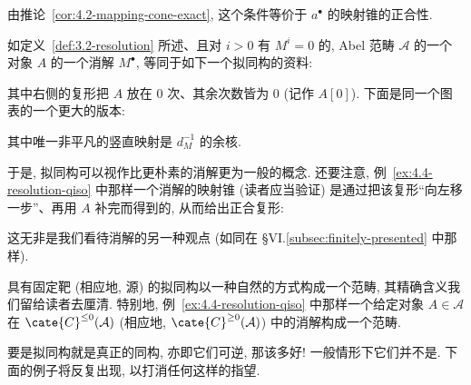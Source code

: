 \indent 由推论~\ref{cor:4.2-mapping-cone-exact}, 这个条件等价于 $a^\bullet$ 的映射锥的正合性.

\begin{example}\label{ex:4.4-resolution-qiso}
如定义~\ref{def:3.2-resolution} 所述、且对 $i>0$ 有 $M^i=0$ 的, Abel 范畴 $\mathcal A$ 的一个对象 $A$ 的一个消解 $M^\bullet$, 等同于如下一个拟同构的资料:
\begin{center}
\end{center}
其中右侧的复形把 $A$ 放在 0 次、其余次数皆为 $0$ (记作 $A[0]$). 下面是同一个图表的一个更大的版本:
\begin{center}
\end{center}
其中唯一非平凡的竖直映射是 $d_M^{-1}$ 的余核.
\end{example}

\indent 于是, 拟同构可以视作比更朴素的消解更为一般的概念. 还要注意, 例~\ref{ex:4.4-resolution-qiso} 中那样一个消解的映射锥 (读者应当验证) 是通过把该复形``向左移一步''、再用 $A$ 补完而得到的, 从而给出正合复形:
\begin{center}
\end{center}
这无非是我们看待消解的另一种观点 (如同在 §VI.\ref{subsec:finitely-presented} 中那样).

\begin{remark}\label{rmk:4.5-qiso-category}
具有固定靶 (相应地, 源) 的拟同构以一种自然的方式构成一个范畴, 其精确含义我们留给读者去厘清. 特别地, 例~\ref{ex:4.4-resolution-qiso} 中那样一个给定对象 $A\in\mathcal A$ 在 $\cate{C}^{\le0}(\mathcal A)$ (相应地, $\cate{C}^{\ge0}(\mathcal A)$) 中的消解构成一个范畴.
\end{remark}

\indent 要是拟同构就是真正的同构, 亦即它们可逆, 那该多好! 一般情形下它们并不是. 下面的例子将反复出现, 以打消任何这样的指望.

